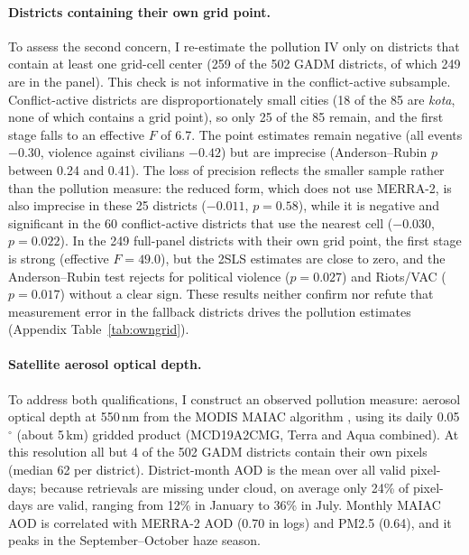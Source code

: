 \documentclass[12pt]{article}
\begin{document}
\paragraph{Districts containing their own grid point.} To assess the second concern, I re-estimate the pollution IV only on districts that contain at least one grid-cell center (259 of the 502 GADM districts, of which 249 are in the panel). This check is not informative in the conflict-active subsample. Conflict-active districts are disproportionately small cities (18 of the 85 are \emph{kota}, none of which contains a grid point), so only 25 of the 85 remain, and the first stage falls to an effective $F$ of 6.7. The point estimates remain negative (all events $-0.30$, violence against civilians $-0.42$) but are imprecise (Anderson--Rubin $p$ between 0.24 and 0.41). The loss of precision reflects the smaller sample rather than the pollution measure: the reduced form, which does not use MERRA-2, is also imprecise in these 25 districts ($-0.011$, $p=0.58$), while it is negative and significant in the 60 conflict-active districts that use the nearest cell ($-0.030$, $p=0.022$). In the 249 full-panel districts with their own grid point, the first stage is strong (effective $F = 49.0$), but the 2SLS estimates are close to zero, and the Anderson--Rubin test rejects for political violence ($p=0.027$) and Riots/VAC ($p=0.017$) without a clear sign. These results neither confirm nor refute that measurement error in the fallback districts drives the pollution estimates (Appendix Table~\ref{tab:owngrid}).

\paragraph{Satellite aerosol optical depth.} To address both qualifications, I construct an observed pollution measure: aerosol optical depth at 550\,nm from the MODIS MAIAC algorithm \citep{lyapustin2018maiac}, using its daily 0.05$^{\circ}$ (about 5\,km) gridded product (MCD19A2CMG, Terra and Aqua combined). At this resolution all but 4 of the 502 GADM districts contain their own pixels (median 62 per district). District-month AOD is the mean over all valid pixel-days; because retrievals are missing under cloud, on average only 24\% of pixel-days are valid, ranging from 12\% in January to 36\% in July. Monthly MAIAC AOD is correlated with MERRA-2 AOD (0.70 in logs) and PM2.5 (0.64), and it peaks in the September--October haze season.
\end{document}
